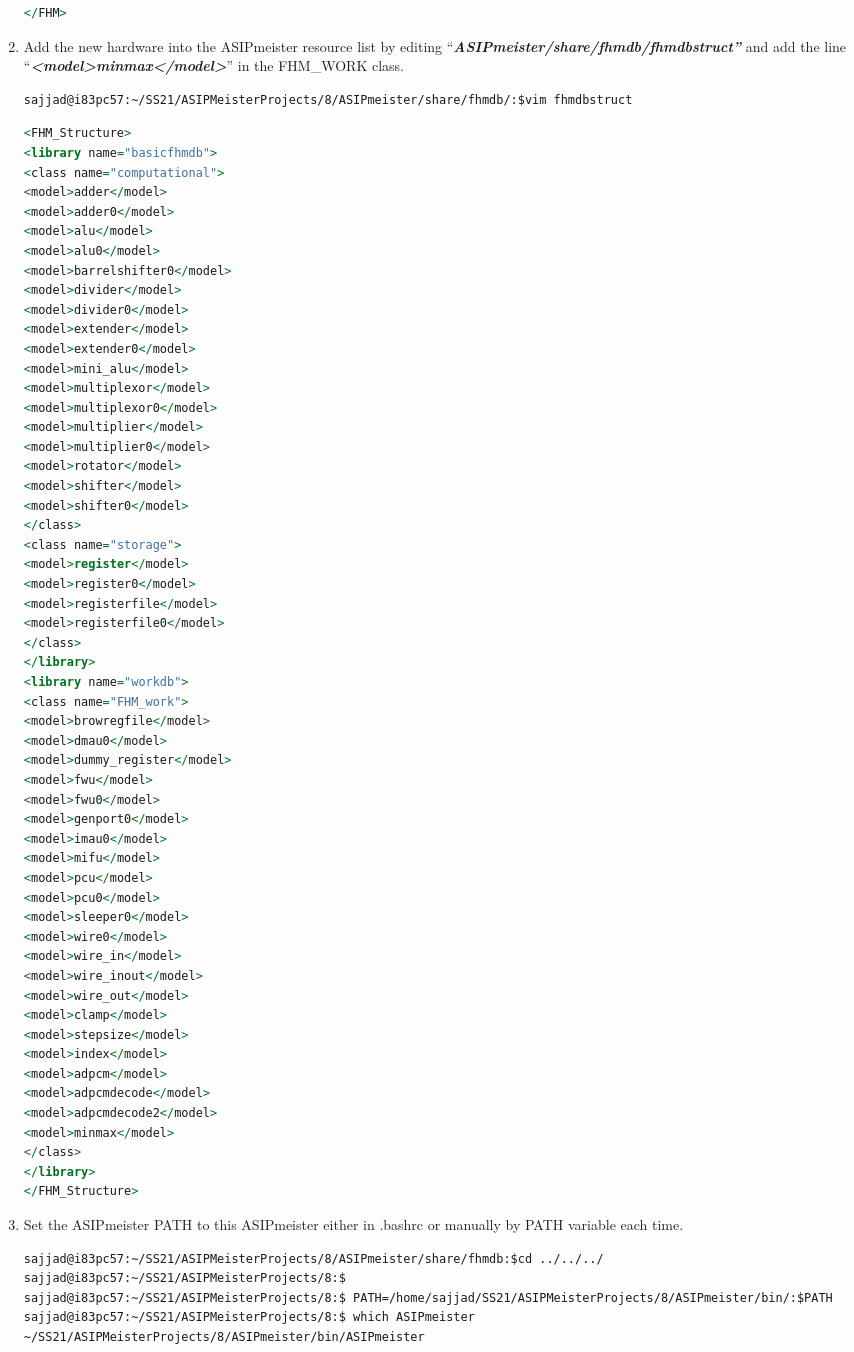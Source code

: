 \begin{enumerate}[resume]
\begin{lstlisting}[language=vhdl,caption={"minmax.fhm"},captionpos=t]
	</FHM>
\end{lstlisting}
\item Add the new hardware into the ASIPmeister resource list by editing
``\emph{\textbf{ASIPmeister/share/fhmdb/}}\emph{\textbf{fhmdbstruct''}}
and add the line
``\emph{\textbf{\textless model\textgreater minmax\textless/model\textgreater{}}}''
in the FHM\_WORK class.
\begin{lstlisting}
sajjad@i83pc57:~/SS21/ASIPMeisterProjects/8/ASIPmeister/share/fhmdb/:$vim fhmdbstruct
\end{lstlisting}
\begin{lstlisting}[language=vhdl,caption={"fhmdbstruct"},captionpos=t]
<FHM_Structure>
<library name="basicfhmdb">
<class name="computational">
<model>adder</model>
<model>adder0</model>
<model>alu</model>
<model>alu0</model>
<model>barrelshifter0</model>
<model>divider</model>
<model>divider0</model>
<model>extender</model>
<model>extender0</model>
<model>mini_alu</model>
<model>multiplexor</model>
<model>multiplexor0</model>
<model>multiplier</model>
<model>multiplier0</model>
<model>rotator</model>
<model>shifter</model>
<model>shifter0</model>
</class>
<class name="storage">
<model>register</model>
<model>register0</model>
<model>registerfile</model>
<model>registerfile0</model>
</class>
</library>
<library name="workdb">
<class name="FHM_work">
<model>browregfile</model>
<model>dmau0</model>
<model>dummy_register</model>
<model>fwu</model>
<model>fwu0</model>
<model>genport0</model>
<model>imau0</model>
<model>mifu</model>
<model>pcu</model>
<model>pcu0</model>
<model>sleeper0</model>
<model>wire0</model>
<model>wire_in</model>
<model>wire_inout</model>
<model>wire_out</model>
<model>clamp</model>
<model>stepsize</model>
<model>index</model>
<model>adpcm</model>
<model>adpcmdecode</model>
<model>adpcmdecode2</model>
<model>minmax</model>
</class>
</library>
</FHM_Structure>
\end{lstlisting}
\item Set the ASIPmeister PATH to this ASIPmeister either in .bashrc or manually by PATH variable each time.
\begin{lstlisting}
sajjad@i83pc57:~/SS21/ASIPMeisterProjects/8/ASIPmeister/share/fhmdb:$cd ../../../
sajjad@i83pc57:~/SS21/ASIPMeisterProjects/8:$
sajjad@i83pc57:~/SS21/ASIPMeisterProjects/8:$ PATH=/home/sajjad/SS21/ASIPMeisterProjects/8/ASIPmeister/bin/:$PATH
sajjad@i83pc57:~/SS21/ASIPMeisterProjects/8:$ which ASIPmeister
~/SS21/ASIPMeisterProjects/8/ASIPmeister/bin/ASIPmeister
\end{lstlisting}
\end{enumerate}
